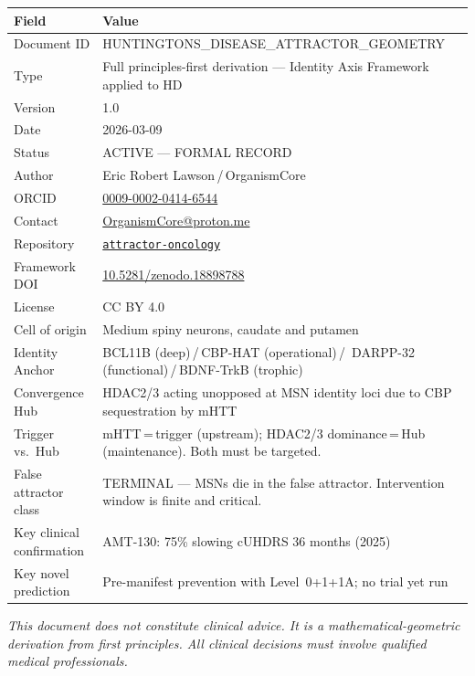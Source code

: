 \documentclass[12pt,a4paper]{article}
\begin{document}
\begin{center}
\begin{tabular}{p{4.2cm}p{9.2cm}}
\toprule
\textbf{Field} & \textbf{Value} \\
\midrule
Document ID &
HUNTINGTONS\_DISEASE\_ATTRACTOR\_GEOMETRY \\
Type &
Full principles-first derivation ---
Identity Axis Framework applied to HD \\
Version & 1.0 \\
Date & 2026-03-09 \\
Status & ACTIVE --- FORMAL RECORD \\
Author & Eric Robert Lawson\,/\,OrganismCore \\
ORCID &
\href{https://orcid.org/0009-0002-0414-6544}%
{0009-0002-0414-6544} \\
Contact &
\href{mailto:OrganismCore@proton.me}%
{OrganismCore@proton.me} \\
Repository &
\href{https://github.com/Eric-Robert-Lawson/attractor-oncology}%
{\texttt{attractor-oncology}} \\
Framework DOI &
\href{https://doi.org/10.5281/zenodo.18898788}%
{10.5281/zenodo.18898788} \\
License & CC BY 4.0 \\
\midrule
Cell of origin &
Medium spiny neurons, caudate and putamen \\
Identity Anchor &
BCL11B (deep)\,/\,CBP-HAT (operational)\,/\,
DARPP-32 (functional)\,/\,BDNF-TrkB (trophic) \\
Convergence Hub &
HDAC2/3 acting unopposed at MSN identity loci
due to CBP sequestration by mHTT \\
Trigger vs.\ Hub &
mHTT\,=\,trigger (upstream);
HDAC2/3 dominance\,=\,Hub (maintenance).
Both must be targeted. \\
False attractor class &
TERMINAL --- MSNs die in the false attractor.
Intervention window is finite and critical. \\
\midrule
Key clinical confirmation &
AMT-130: 75\% slowing cUHDRS 36 months (2025) \\
Key novel prediction &
Pre-manifest prevention with Level~0+1+1A;
no trial yet run \\
\bottomrule
\end{tabular}
\end{center}

\bigskip\noindent
\textit{This document does not constitute clinical advice.
It is a mathematical-geometric derivation from first
principles. All clinical decisions must involve qualified
medical professionals.}
\end{document}
